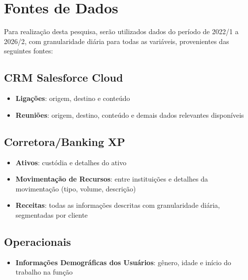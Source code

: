 \section{Fontes de Dados}

Para realização desta pesquisa, serão utilizados dados do período de 2022/1 a 2026/2, com granularidade diária para todas as variáveis, provenientes das seguintes fontes:

\subsection{CRM Salesforce Cloud}
\begin{itemize}
  \item \textbf{Ligações}: origem, destino e conteúdo
  \item \textbf{Reuniões}: origem, destino, conteúdo e demais dados relevantes disponíveis
\end{itemize}

\subsection{Corretora/Banking XP}
\begin{itemize}
  \item \textbf{Ativos}: custódia e detalhes do ativo
  \item \textbf{Movimentação de Recursos}: entre instituições e detalhes da movimentação (tipo, volume, descrição)
  \item \textbf{Receitas}: todas as informações descritas com granularidade diária, segmentadas por cliente
\end{itemize}

\subsection{Operacionais}
\begin{itemize}
  \item \textbf{Informações Demográficas dos Usuários}: gênero, idade e início do trabalho na função
\end{itemize}